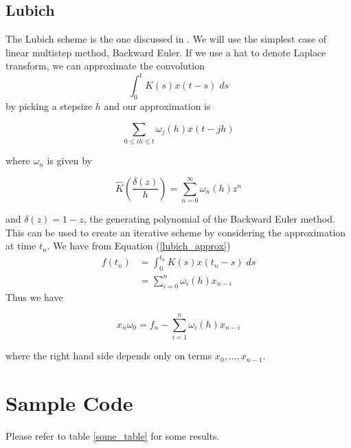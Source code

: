 \documentclass[11pt]{article}
\numberwithin{equation}{section}
\theoremstyle{definition}
\newcommand{\eqn}[2]{
  \begin{equation}
    \label{#1}
    #2
  \end{equation}
}
\newcommand{\eqr}[1]{Equation (\ref{#1})}
\begin{document}
\subsection{Lubich}
The Lubich scheme is the one discussed in \cite{lubich}. We will use the simplest
case of linear multistep method, Backward Euler. If we use a hat to denote Laplace
transform, we can approximate the convolution
$$
  \int_0^t K(s) x(t - s)\; ds
$$
by picking a stepsize $h$ and our approximation is
\eqn{lubich_approx}{
  \sum_{0 \leq ih \leq t} \omega_j(h) x(t - jh)
}
where $\omega_n$ is given by
\eqn{lubich_omega}{
  \hat{K}\left(\frac{\delta(z)}{h}\right) = \sum_{n=0}^\infty \omega_n(h) z^n
}
and $\delta(z) = 1-z$, the generating polynomial of the Backward Euler method.
This can be used to create an iterative scheme by considering the approximation
at time $t_n$. We have from \eqr{lubich_approx}
\begin{align}
\nonumber  f(t_n)
                  &= \int_0^{t_n} K(s) x(t_n - s)\; ds \\
                  &= \sum_{i=0}^{n} \omega_i(h) x_{n-i}
\end{align}
Thus we have
\eqn{lubich_scheme}{
  x_n \omega_0 = f_n - \sum_{i=1}^n \omega_i(h) x_{n-i}
}
where the right hand side depends only on terms $x_0, ..., x_{n-1}$.
\section{Sample Code}
\lstset{caption=Basic Scheme}

\lstset{caption=Lubich Scheme}

Please refer to table \ref{some_table} for some results.
\end{document}
